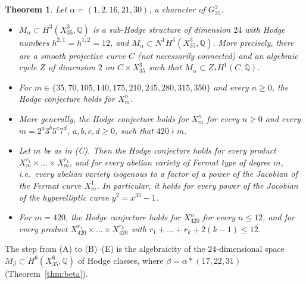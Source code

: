 \documentclass[11pt]{amsart}
\newtheorem{theorem}{Theorem}[section]
\theoremstyle{definition}
\theoremstyle{remark}
\numberwithin{equation}{section}
\newcommand{\Q}{\mathbb{Q}}
\begin{document}
\begin{theorem}\label{thm:main}
Let $\alpha=(1,2,16,21,30)$, a character of $G^3_{35}$.
\begin{itemize}
\item[(A)] $M_\alpha\subset H^3(X^3_{35},\Q)$ is a sub-Hodge structure of dimension $24$ with Hodge numbers $h^{2,1}=h^{1,2}=12$, and $M_\alpha\subset N^1H^3(X^3_{35},\Q)$. More precisely, there are a smooth projective curve $C$ (not necessarily connected) and an algebraic cycle $Z$ of dimension $2$ on $C\times X^3_{35}$ such that $M_\alpha\subset Z_*H^1(C,\Q)$.
\item[(B)] For $m\in\{35,70,105,140,175,210,245,280,315,350\}$ and every $n\ge0$, the Hodge conjecture holds for $X^n_m$.
\item[(C)] More generally, the Hodge conjecture holds for $X^n_m$ for every $n\ge0$ and every $m=2^a3^b5^c7^d$, $a,b,c,d\ge0$, such that $420\nmid m$.
\item[(D)] Let $m$ be as in {\rm(C)}. Then the Hodge conjecture holds for every product $X^{r_1}_m\times\dots\times X^{r_k}_m$, and for every abelian variety of Fermat type of degree $m$, i.e.\ every abelian variety isogenous to a factor of a power of the Jacobian of the Fermat curve $X^1_m$. In particular, it holds for every power of the Jacobian of the hyperelliptic curve $y^2=x^{35}-1$.
\item[(E)] For $m=420$, the Hodge conjecture holds for $X^n_{420}$ for every $n\le12$, and for every product $X^{r_1}_{420}\times\dots\times X^{r_k}_{420}$ with $r_1+\dots+r_k+2(k-1)\le12$.
\end{itemize}
\end{theorem}

The step from (A) to (B)--(E) is the algebraicity of the $24$-dimensional space $M_\beta\subset H^6(X^6_{35},\Q)$ of Hodge classes, where $\beta=\alpha*(17,22,31)$ (Theorem~\ref{thm:beta}).
\end{document}
